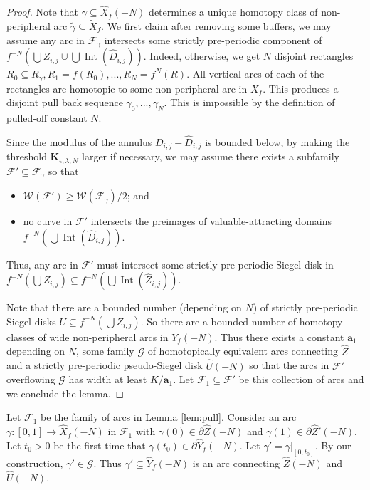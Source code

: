 \documentclass[11pt, reqno]{amsart}
\numberwithin{equation}{section}
\theoremstyle{plain}
\theoremstyle{theorem}
\theoremstyle{plain}
\theoremstyle{definition}
\DeclareMathOperator{\Int}{Int}
\numberwithin{figure}{section}
\begin{document}
\begin{proof}
Note that $\gamma \subseteq \widehat X_f(-N)$ determines a unique homotopy class of non-peripheral arc $\widetilde \gamma \subseteq \widetilde X_f$.
We first claim after removing some buffers, we may assume any arc in $\mathcal{F}_\gamma$ intersects some strictly pre-periodic component of $f^{-N}(\bigcup Z_{i,j} \cup \bigcup \Int(\widehat D_{i,j}))$.
Indeed, otherwise, we get $N$ disjoint rectangles $R_0 \subseteq R_\gamma, R_1 = f(R_0), ..., R_N = f^N(R)$. 
All vertical arcs of each of the rectangles are homotopic to some non-peripheral arc in $X_f$. 
This produces a disjoint pull back sequence $\gamma_0, ..., \gamma_{N}$.
This is impossible by the definition of pulled-off constant $N$.


Since the modulus of the annulus $D_{i,j} - \widehat D_{i,j}$ is bounded below, by making the threshold $\mathbf{K}_{\epsilon,\lambda, N}$ larger if necessary, we may assume there exists a subfamily $\mathcal{F}' \subseteq \mathcal{F}_\gamma$ so that
\begin{itemize}
\item $\mathcal{W}(\mathcal{F}') \geq \mathcal{W}(\mathcal{F}_\gamma) / 2$;  and 
\item no curve in $\mathcal{F}'$ intersects the preimages of valuable-attracting domains $f^{-N}(\bigcup \Int(\widehat D_{i,j}))$.
\end{itemize}
Thus, any arc in $\mathcal{F}'$ must intersect some strictly pre-periodic Siegel disk in $f^{-N}(\bigcup Z_{i,j}) \subseteq f^{-N}(\bigcup \Int(\widehat Z_{i,j}))$.

Note that there are a bounded number (depending on $N$) of strictly pre-periodic Siegel disks $U \subseteq f^{-N}(\bigcup Z_{i,j})$.
So there are a bounded number of homotopy classes of wide non-peripheral arcs in $Y_f(-{N})$.
Thus there exists a constant $\mathbf{a}_1$ depending on $N$, some family $\mathcal{G}$ of homotopically equivalent arcs connecting $\widehat Z$ and a strictly pre-periodic pseudo-Siegel disk $\widehat U(-{N})$ so that the arcs in $\mathcal{F}'$ overflowing $\mathcal{G}$ has width at least $K/\mathbf{a}_1$. 
Let $\mathcal{F}_1 \subseteq \mathcal{F}'$ be this collection of arcs and we conclude the lemma.
\end{proof}

Let $\mathcal{F}_1$ be the family of arcs in Lemma \ref{lem:pull}.
Consider an arc $\gamma: [0,1] \longrightarrow \widehat X_f(-{N})$ in $\mathcal{F}_1$ with $\gamma(0) \in \partial \widehat Z(-{N})$ and $\gamma(1) \in \partial \widehat Z'(-{N})$.
Let $t_0 > 0$ be the first time that $\gamma(t_0) \in \partial \widehat Y_f(-{N})$.
Let $\gamma' = \gamma|_{[0, t_0]}$.
By our construction, $\gamma' \in \mathcal{G}$. Thus $\gamma' \subseteq \widehat Y_f(-{N})$ is an arc connecting $\widehat Z(-{N})$ and $\widehat U(-{N})$.
\end{document}
